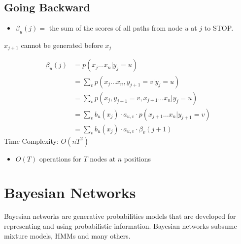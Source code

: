 \documentclass[a4paper]{article}
\begin{document}
\subsection{Going Backward}
\begin{itemize}
	\item $\beta_u(j) =$ the sum of the scores of all paths from node $u$ at $j$ to STOP.
\end{itemize}
\begin{framed}
	\begin{displayquote}
		\begin{center}
			$x_{j+1}$ cannot be generated before $x_j$
		\end{center}
	\end{displayquote}
\end{framed}
\begin{align*}
	\beta_u(j) &= p(x_j...x_n | y_j = u)\\
	&= \sum_v p(x_j...x_n, y_{j+1} = v | y_j = u)\\
	&= \sum_v p(x_j, y_{j+1} = v, x_{j+1}... x_n | y_j =u)\\
	&= \sum_v b_u(x_j) \cdot a_{u,v} \cdot p(x_{j+1}...x_n | y_{j+1} = v)\\
	&= \sum_v b_u(x_j) \cdot a_{u,v} \cdot \beta_v(j+1)
\end{align*}
Time Complexity: $O(nT^2)$
\begin{itemize}
	\item $O(T)$ operations for $T$ nodes at $n$ positions
\end{itemize}

\section{Bayesian Networks}
Bayesian networks are generative probabilities models that are developed for representing and using probabilistic information. Bayesian networks subsume mixture models, HMMs and many others.
\end{document}

